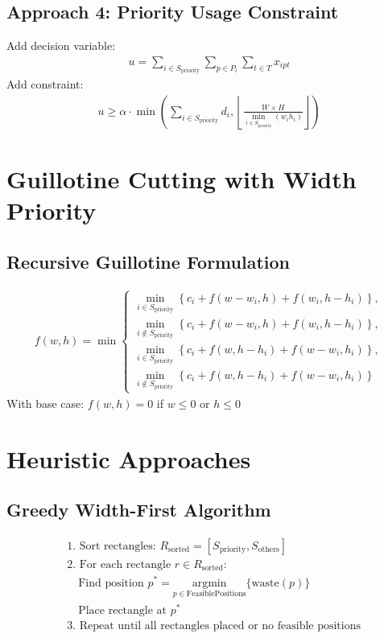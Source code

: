 \documentclass{article}
\begin{document}
\subsection{Approach 4: Priority Usage Constraint}
Add decision variable:
\begin{align*}
u = \sum_{i \in S_{\text{priority}}} \sum_{p \in P_i} \sum_{t \in T} x_{ipt}
\end{align*}
Add constraint:
\begin{align}
u \geq \alpha \cdot \min\left(\sum_{i \in S_{\text{priority}}} d_i, \left\lfloor \frac{W \times H}{\min_{i \in S_{\text{priority}}}(w_i h_i)} \right\rfloor\right)
\end{align}

\section{Guillotine Cutting with Width Priority}

\subsection{Recursive Guillotine Formulation}
\begin{align*}
f(w, h) = \min \left\{ 
\begin{array}{l}
\min\limits_{i \in S_{\text{priority}}} \left\{ c_i + f(w - w_i, h) + f(w_i, h - h_i) \right\}, \\
\min\limits_{i \notin S_{\text{priority}}} \left\{ c_i + f(w - w_i, h) + f(w_i, h - h_i) \right\}, \\
\min\limits_{i \in S_{\text{priority}}} \left\{ c_i + f(w, h - h_i) + f(w - w_i, h_i) \right\}, \\
\min\limits_{i \notin S_{\text{priority}}} \left\{ c_i + f(w, h - h_i) + f(w - w_i, h_i) \right\}
\end{array}
\right.
\end{align*}
With base case: $f(w, h) = 0$ if $w \leq 0$ or $h \leq 0$

\section{Heuristic Approaches}

\subsection{Greedy Width-First Algorithm}
\begin{align*}
&\text{1. Sort rectangles: } R_{\text{sorted}} = [S_{\text{priority}}, S_{\text{others}}] \\
&\text{2. For each rectangle } r \in R_{\text{sorted}}: \\
&\quad \text{Find position } p^* = \underset{p \in \text{FeasiblePositions}}{\text{argmin}} \{\text{waste}(p)\} \\
&\quad \text{Place rectangle at } p^* \\
&\text{3. Repeat until all rectangles placed or no feasible positions}
\end{align*}
\end{document}
